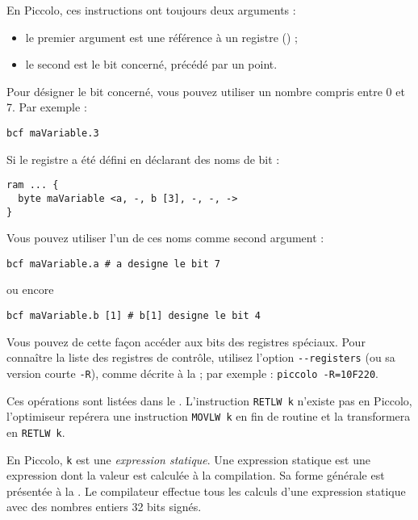 En Piccolo, ces instructions ont toujours deux arguments :
\begin{itemize}
  \item le premier argument est une référence à un registre () ;
  \item le second est le bit concerné, précédé par un point.
\end{itemize}

Pour désigner le bit concerné, vous pouvez utiliser un nombre compris entre 0 et 7. Par exemple :
\begin{lstlisting}[language=piccolo]
bcf maVariable.3
\end{lstlisting}

Si le registre a été défini en déclarant des noms de bit :
\begin{lstlisting}[language=piccolo]
ram ... {
  byte maVariable <a, -, b [3], -, -, ->
}
\end{lstlisting}

Vous pouvez utiliser l’un de ces noms comme second argument :
\begin{lstlisting}[language=piccolo]
bcf maVariable.a # a designe le bit 7
\end{lstlisting}
ou encore
\begin{lstlisting}[language=piccolo]
bcf maVariable.b [1] # b[1] designe le bit 4
\end{lstlisting}

Vous pouvez de cette façon accéder aux bits des registres spéciaux. Pour connaître la liste des registres de contrôle, utilisez l’option \texttt{-{}-registers} (ou sa version courte \texttt{-R}), comme décrite à la  ; par exemple : \texttt{piccolo -R=10F220}.



Ces opérations sont listées dans le . L’instruction \texttt{RETLW k} n’existe pas en Piccolo, l’optimiseur repérera une instruction \texttt{MOVLW k} en fin de routine et la transformera en \texttt{RETLW k}.

En Piccolo, \texttt{k} est une \emph{expression statique}. Une expression statique est une expression dont la valeur est calculée à la compilation. Sa forme générale est présentée à la . Le compilateur effectue tous les calculs d'une expression statique avec des nombres entiers 32 bits signés.

